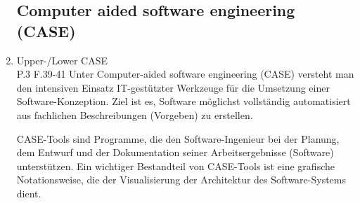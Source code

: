 \documentclass[10pt,a4paper,fleqn]{article}
\begin{document}
\begin{enumerate}
\subsection{Computer aided software engineering (CASE)}
	\item Upper-/Lower CASE\\
	P.3 F.39-41
		Unter Computer-aided software engineering (CASE) versteht man den intensiven Einsatz IT-gestützter Werkzeuge für die Umsetzung einer Software-Konzeption. Ziel ist es, Software möglichst vollständig automatisiert aus fachlichen Beschreibungen (Vorgeben) zu erstellen.
		
		CASE-Tools sind Programme, die den Software-Ingenieur bei der Planung, dem Entwurf und der Dokumentation seiner Arbeitsergebnisse (Software) unterstützen. Ein wichtiger Bestandteil von CASE-Tools ist eine grafische Notationsweise, die der Visualisierung der Architektur des Software-Systems dient.


\end{enumerate}
\end{document}
